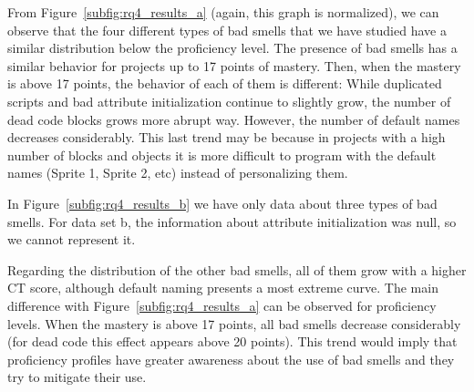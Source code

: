 From Figure~\ref{subfig:rq4_results_a} (again, this graph is normalized), we can observe that the four different types of bad smells that we have studied have a similar distribution below the proficiency level. The presence of bad smells has a similar behavior for projects up to 17 points of mastery. Then, when the mastery is above 17 points, the behavior of each of them is different: While duplicated scripts and bad attribute initialization continue to slightly grow, the number of dead code blocks grows more abrupt way. However, the number of default names decreases considerably. This last trend may be because in projects with a high number of blocks and objects it is more difficult to program with the default names (Sprite 1, Sprite 2, etc) instead of personalizing them. 

In Figure~\ref{subfig:rq4_results_b} we have only data about three types of bad smells. For data set b, the information about attribute initialization was null, so we cannot represent it. 

Regarding the distribution of the other bad smells, all of them grow with a higher CT score, although default naming presents a most extreme curve. The main difference with Figure~\ref{subfig:rq4_results_a} can be observed for proficiency levels. When the mastery is above 17 points, all bad smells decrease considerably (for dead code this effect appears above 20 points). This trend would imply that proficiency profiles have greater awareness about the use of bad smells and they try to mitigate their use. 


